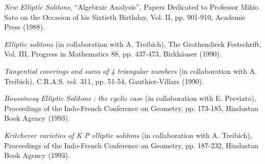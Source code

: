 \begin{description}
\item[{[50]}] \emph{New Elliptic Solitons}, ``Algebraic Analysis'', Papers
Dedicated to Professor Mikio Sato on the Occasion of his Sixtieth Birthday,
Vol. II, pp. 901-910, Academic Press (1988).

\item[{[51]}] \emph{Elliptic solitons} (in collaboration with A. Treibich),
The Grothendieck Festschrift, Vol. III, Progress in Mathematics 88,
pp. 437-473, Birkhäuser (1990).

\item[{[52]}] \emph{Tangential coverings and sums of 4 triangular numbers}
(in collaboration with A. Treibich), C.R.A.S. vol. 311, pp. 51-54,
Gauthier-Villars (1990).

\item[{[53]}] \emph{Boussinesq Elliptic Solitons : the cyclic case}
(in collaboration with E. Previato), Proceedings of the Indo-French
Conference on Geometry, pp. 173-185, Hindustan Book Agency (1993).

\item[{[54]}] \emph{Kritchever varieties of K P elliptic solitons}
(in collaboration with A. Treibich), Proceedings of the Indo-French
Conference on Geometry, pp. 187-232, Hindustan Book Agency (1993).
\end{description}
